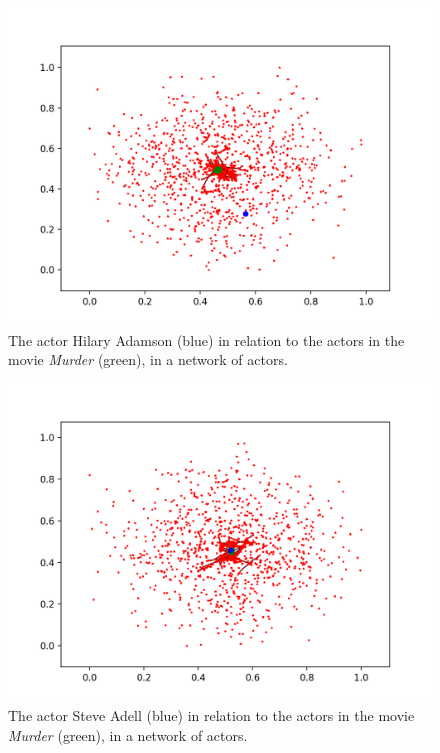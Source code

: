 \documentclass[12pt]{ieeeconf}      %
\begin{document}
\begin{figure}[H]
  \begin{center}
   \includegraphics[width=.75\textwidth]{figures/network-unknown}
    \caption{The actor Hilary Adamson (blue) in relation to the actors in the movie \textit{Murder} (green), in a network of actors.}
    \label{network:unknown}
  \end{center}
\end{figure}

\begin{figure}[H]
  \begin{center}
   \includegraphics[width=.75\textwidth]{figures/network-existing}
    \caption{The actor Steve Adell (blue) in relation to the actors in the movie \textit{Murder} (green), in a network of actors.}
    \label{network:existing}
  \end{center}
\end{figure}
\end{document}
